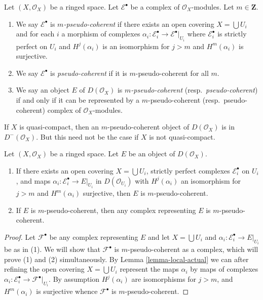 \begin{definition}
\label{definition-pseudo-coherent}
Let $(X, \mathcal{O}_X)$ be a ringed space. Let $\mathcal{E}^\bullet$
be a complex of $\mathcal{O}_X$-modules. Let $m \in \mathbf{Z}$.
\begin{enumerate}
\item We say $\mathcal{E}^\bullet$ is {\it $m$-pseudo-coherent}
if there exists an open covering $X = \bigcup U_i$ and for each $i$
a morphism of complexes
$\alpha_i : \mathcal{E}_i^\bullet \to \mathcal{E}^\bullet|_{U_i}$
where $\mathcal{E}_i^\bullet$ is strictly perfect on $U_i$ and
$H^j(\alpha_i)$ is an isomorphism for $j > m$ and $H^m(\alpha_i)$
is surjective.
\item We say $\mathcal{E}^\bullet$ is {\it pseudo-coherent}
if it is $m$-pseudo-coherent for all $m$.
\item We say an object $E$ of $D(\mathcal{O}_X)$ is
{\it $m$-pseudo-coherent} (resp.\ {\it pseudo-coherent})
if and only if it can be represented by a $m$-pseudo-coherent
(resp.\ pseudo-coherent) complex of $\mathcal{O}_X$-modules.
\end{enumerate}
\end{definition}

\noindent
If $X$ is quasi-compact, then an $m$-pseudo-coherent object
of $D(\mathcal{O}_X)$ is in $D^-(\mathcal{O}_X)$. But this need
not be the case if $X$ is not quasi-compact.

\begin{lemma}
\label{lemma-pseudo-coherent-independent-representative}
Let $(X, \mathcal{O}_X)$ be a ringed space. Let $E$ be an object
of $D(\mathcal{O}_X)$.
\begin{enumerate}
\item If there exists an open covering $X = \bigcup U_i$,
strictly perfect complexes $\mathcal{E}_i^\bullet$ on $U_i$, and
maps $\alpha_i : \mathcal{E}_i^\bullet \to E|_{U_i}$ in
$D(\mathcal{O}_{U_i})$ with $H^j(\alpha_i)$ an isomorphism for $j > m$
and $H^m(\alpha_i)$ surjective, then $E$ is $m$-pseudo-coherent.
\item If $E$ is $m$-pseudo-coherent, then any complex representing
$E$ is $m$-pseudo-coherent.
\end{enumerate}
\end{lemma}

\begin{proof}
Let $\mathcal{F}^\bullet$ be any complex representing $E$
and let $X = \bigcup U_i$ and
$\alpha_i : \mathcal{E}_i^\bullet \to E|_{U_i}$ be as in (1).
We will show that $\mathcal{F}^\bullet$ is $m$-pseudo-coherent
as a complex, which will prove (1) and (2) simultaneously.
By Lemma \ref{lemma-local-actual}
we can after refining the open covering $X = \bigcup U_i$
represent the maps $\alpha_i$ by maps of complexes
$\alpha_i : \mathcal{E}_i^\bullet \to \mathcal{F}^\bullet|_{U_i}$.
By assumption
$H^j(\alpha_i)$ are isomorphisms for $j > m$, and $H^m(\alpha_i)$
is surjective whence $\mathcal{F}^\bullet$ is
$m$-pseudo-coherent.
\end{proof}

